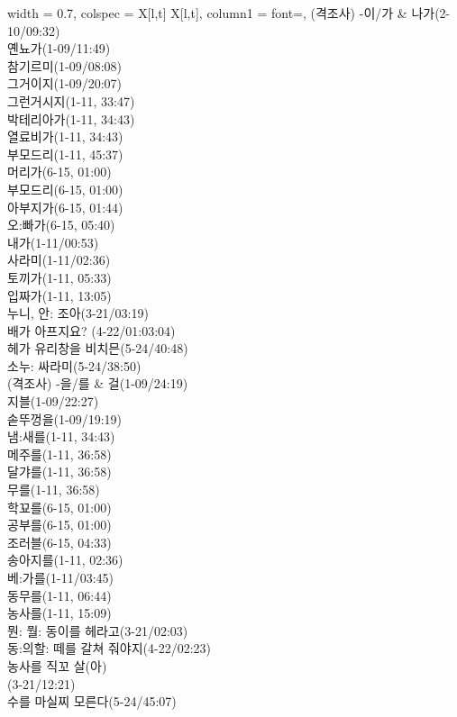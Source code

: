 \begin{longtblr}{
    width = 0.7\textwidth,
    colspec = {X[l,t] X[l,t]},
    column{1} = {font=\sffamily\bfseries},
  }
  (격조사) -이/가 & {나가(2-10/09:32) \\ 옌뇨가(1-09/11:49) \\ 참기르미(1-09/08:08) \\ 그거이지(1-09/20:07) \\ 그런거시지(1-11, 33:47) \\ 박테리아가(1-11, 34:43) \\ 열료비가(1-11, 34:43) \\ 부모드리(1-11, 45:37) \\ 머리가(6-15, 01:00) \\ 부모드리(6-15, 01:00) \\ 아부지가(6-15, 01:44) \\ 오:빠가(6-15, 05:40) \\ 내가(1-11/00:53) \\ 사라미(1-11/02:36) \\ 토끼가(1-11, 05:33) \\ 입짜가(1-11, 13:05) \\ 누니, 안: 조아(3-21/03:19) \\ 배가 아프지요?   (4-22/01:03:04) \\ 헤가 유리창을 비치믄(5-24/40:48) \\ 소누: 싸라미(5-24/38:50)} \\
  (격조사) -을/를 & {걸(1-09/24:19) \\ 지블(1-09/22:27) \\ 솓뚜껑을(1-09/19:19) \\ 냄:새를(1-11, 34:43) \\ 메주를(1-11, 36:58) \\ 달갸를(1-11, 36:58) \\ 무를(1-11, 36:58) \\ 학꾜를(6-15, 01:00) \\ 공부를(6-15, 01:00) \\ 조러블(6-15, 04:33) \\ 송아지를(1-11, 02:36) \\ 베:가를(1-11/03:45) \\ 동무를(1-11, 06:44) \\ 농사를(1-11, 15:09) \\ 뭔: 뭘: 동이를 헤라고(3-21/02:03) \\ 동:의할: 떼를 갈쳐   줘야지(4-22/02:23) \\ 농사를 직꼬 살(아) \\ (3-21/12:21) \\ 수를 마실찌 모른다(5-24/45:07)} \\

\end{longtblr}
